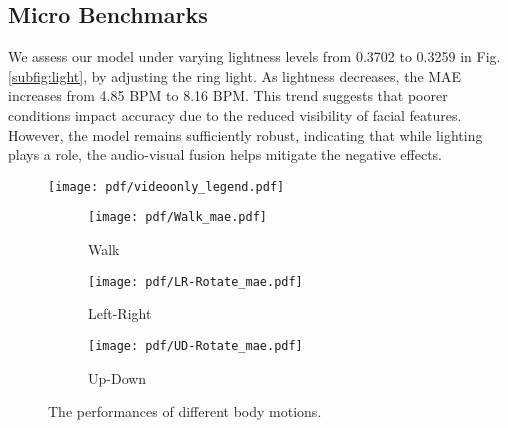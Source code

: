 \subsection{Micro Benchmarks}

We assess our model under varying lightness levels from 0.3702 to 0.3259 in Fig.\ref{subfig:light}, by adjusting the ring light. As lightness decreases, the MAE increases from 4.85 BPM to 8.16 BPM. This trend suggests that poorer conditions impact accuracy due to the reduced visibility of facial features. However, the model remains sufficiently robust, indicating that while lighting plays a role, the audio-visual fusion helps mitigate the negative effects.

\begin{figure}[t]
    \centering
    \begin{minipage}{\linewidth}
        \centering
        \texttt{[image: pdf/videoonly\_legend.pdf]}
    \end{minipage}
    
    \begin{minipage}{\linewidth}
        \begin{subfigure}{.32\linewidth}
            \texttt{[image: pdf/Walk\_mae.pdf]}
            \caption{Walk}
            \label{subfig:move_walk}
        \end{subfigure}\hfill
        \begin{subfigure}{.32\linewidth}
            \texttt{[image: pdf/LR-Rotate\_mae.pdf]}
            \caption{Left-Right}
            \label{subfig:move_lr}
        \end{subfigure}\hfill
        \begin{subfigure}{.32\linewidth}
            \texttt{[image: pdf/UD-Rotate\_mae.pdf]}
            \caption{Up-Down}
            \label{subfig:move_ud}
        \end{subfigure}
    \end{minipage}
    \caption{The performances of different body motions.}
    \label{fig: res_move}
\end{figure}
